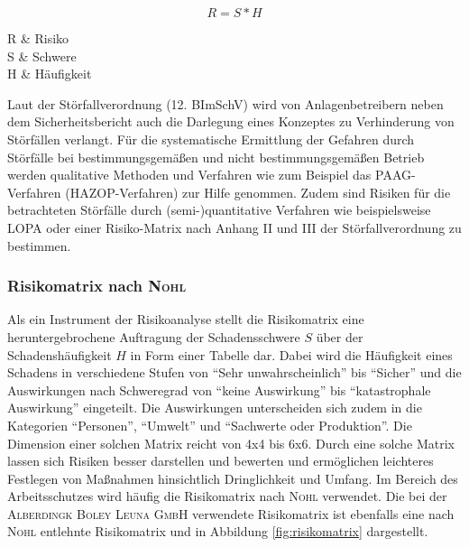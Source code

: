 \begin{equation}
	\label{gl:risiko}
	R = S*H
\end{equation}
\begin{parameter}
	R 		& Risiko \\
	S 		& Schwere\\
	H 		& Häufigkeit\\
\end{parameter}

Laut der Störfallverordnung (12. BImSchV) wird von Anlagenbetreibern neben dem Sicherheitsbericht auch die Darlegung eines Konzeptes zu Verhinderung von Störfällen verlangt. Für die systematische Ermittlung der Gefahren durch Störfälle bei bestimmungsgemäßen und nicht bestimmungsgemäßen Betrieb werden qualitative Methoden und Verfahren wie zum Beispiel das PAAG-Verfahren (HAZOP-Verfahren) zur Hilfe genommen. Zudem sind Risiken für die betrachteten Störfälle durch (semi-)quantitative Verfahren wie beispielsweise LOPA oder einer Risiko-Matrix nach Anhang II und III der Störfallverordnung zu bestimmen. \cite{Neumann.2010c}


\subsubsection{Risikomatrix nach \textsc{Nohl}}
Als ein Instrument der Risikoanalyse stellt die Risikomatrix eine heruntergebrochene Auftragung der Schadensschwere $S$ über der Schadenshäufigkeit $H$ in Form einer Tabelle dar. Dabei wird die Häufigkeit eines Schadens in verschiedene Stufen von "`Sehr unwahrscheinlich"' bis "`Sicher"' und die Auswirkungen nach Schweregrad von "`keine Auswirkung"' bis "`katastrophale Auswirkung"' eingeteilt. Die Auswirkungen unterscheiden sich zudem in die Kategorien "`Personen"', "`Umwelt"' und "`Sachwerte oder Produktion"'. Die Dimension einer solchen Matrix reicht von 4x4 bis 6x6. Durch eine solche Matrix lassen sich Risiken besser darstellen und bewerten und ermöglichen leichteres Festlegen von Maßnahmen hinsichtlich Dringlichkeit und Umfang. Im Bereich des Arbeitsschutzes wird häufig die Risikomatrix nach \textsc{Nohl} verwendet. \cite{Neumann.2010b}\linebreak
Die bei der \textsc{Alberdingk Boley Leuna GmbH} verwendete Risikomatrix ist ebenfalls eine nach \textsc{Nohl} entlehnte Risikomatrix und in Abbildung \ref{fig:risikomatrix} dargestellt. 

